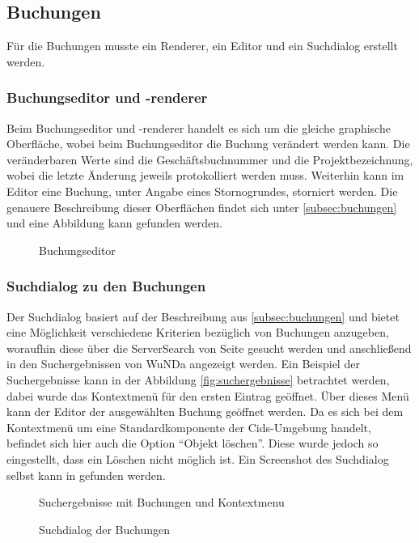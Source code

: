 
\subsection{Buchungen}
Für die Buchungen musste ein Renderer, ein Editor und ein Suchdialog erstellt werden.

\subsubsection{Buchungseditor und -renderer}
Beim Buchungseditor und -renderer handelt es sich um die gleiche graphische Oberfläche, wobei beim Buchungseditor die Buchung verändert werden kann.
Die veränderbaren Werte sind die Geschäftsbuchnummer und die Projektbezeichnung, wobei die letzte Änderung jeweils protokolliert werden muss.
Weiterhin kann im Editor eine Buchung, unter Angabe eines Stornogrundes, storniert werden.
Die genauere Beschreibung dieser Oberflächen findet sich unter \autoref{subsec:buchungen} und eine Abbildung kann  gefunden werden.

\begin{figure}[htbp]
	\centering
	\caption{Buchungseditor}
	\label{fig:buchungseditor}
\end{figure}

\subsubsection{Suchdialog zu den Buchungen}
Der Suchdialog basiert auf der Beschreibung aus \autoref{subsec:buchungen} und bietet eine Möglichkeit verschiedene Kriterien bezüglich von Buchungen anzugeben, woraufhin diese über die ServerSearch von Seite \pageref{subsec:serversearch} gesucht werden und anschließend in den Suchergebnissen von \ac{WuNDa} angezeigt werden.
Ein Beispiel der Suchergebnisse kann in der Abbildung \vref{fig:suchergebnisse} betrachtet werden, dabei wurde das Kontextmenü für den ersten Eintrag geöffnet.
Über dieses Menü kann der Editor der ausgewählten Buchung geöffnet werden.
Da es sich bei dem Kontextmenü um eine Standardkomponente der Cids-Umgebung handelt, befindet sich hier auch die Option "`Objekt löschen"'.
Diese wurde jedoch so eingestellt, dass ein Löschen nicht möglich ist.
Ein Screenshot des Suchdialog selbst kann in  gefunden werden.

\begin{figure}[htb]
	\centering
	\caption{Suchergebnisse mit Buchungen und Kontextmenu}
	\label{fig:suchergebnisse}
\end{figure}
\begin{figure}[htbp]
	\centering
	\caption{Suchdialog der Buchungen}
	\label{fig:gui-suchdialog}
\end{figure}

